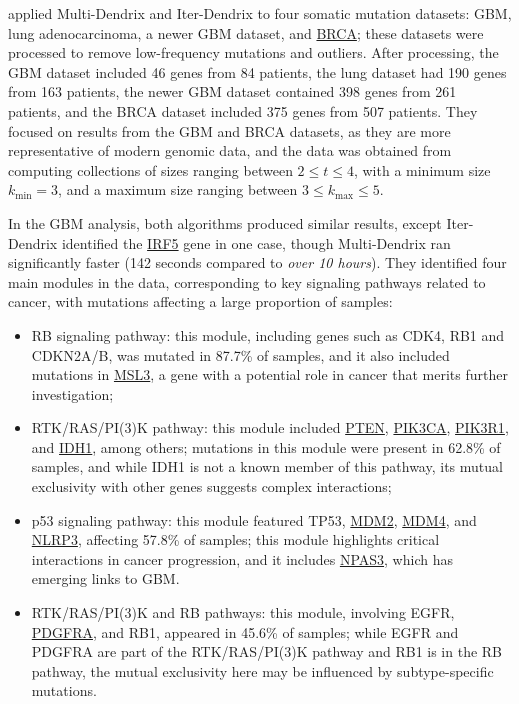 \textcite{multi-dendrix} applied Multi-Dendrix and Iter-Dendrix to four somatic mutation datasets: GBM, lung adenocarcinoma, a newer GBM dataset, and \href{https://en.wikipedia.org/wiki/Breast_cancer}{BRCA}; these datasets were processed to remove low-frequency mutations and outliers. After processing, the GBM dataset included 46 genes from 84 patients, the lung dataset had 190 genes from 163 patients, the newer GBM dataset contained 398 genes from 261 patients, and the BRCA dataset included 375 genes from 507 patients. They focused on results from the GBM and BRCA datasets, as they are more representative of modern genomic data, and the data was obtained from computing collections of sizes ranging between $2 \le t \le 4$, with a minimum size $k_\mathrm {min} = 3$, and a maximum size ranging between $3 \le k_\mathrm{max} \le 5$.

In the GBM analysis, both algorithms produced similar results, except Iter-Dendrix identified the \href{https://en.wikipedia.org/wiki/IRF5}{IRF5} gene in one case, though Multi-Dendrix ran significantly faster (142 seconds compared to \textit{over 10 hours}). They identified four main modules in the data, corresponding to key signaling pathways related to cancer, with mutations affecting a large proportion of samples:

\begin{itemize}
    \item RB signaling pathway: this module, including genes such as CDK4, RB1 and CDKN2A/B, was mutated in 87.7\% of samples, and it also included mutations in \href{https://www.genecards.org/cgi-bin/carddisp.pl?gene=MSL3}{MSL3}, a gene with a potential role in cancer that merits further investigation;
    \item RTK/RAS/PI(3)K pathway: this module included \href{https://en.wikipedia.org/wiki/PTEN_(gene)}{PTEN}, \href{https://en.wikipedia.org/wiki/P110%CE%B1}{PIK3CA}, \href{https://en.wikipedia.org/wiki/PIK3R1}{PIK3R1}, and \href{https://en.wikipedia.org/wiki/IDH1}{IDH1}, among others; mutations in this module were present in 62.8\% of samples, and while IDH1 is not a known member of this pathway, its mutual exclusivity with other genes suggests complex interactions;
    \item p53 signaling pathway: this module featured TP53, \href{https://en.wikipedia.org/wiki/Mdm2}{MDM2}, \href{https://en.wikipedia.org/wiki/MDM4}{MDM4}, and \href{https://en.wikipedia.org/wiki/NLRP3}{NLRP3}, affecting 57.8\% of samples; this module highlights critical interactions in cancer progression, and it includes \href{https://en.wikipedia.org/wiki/NPAS3}{NPAS3}, which has emerging links to GBM.
    \item RTK/RAS/PI(3)K and RB pathways: this module, involving EGFR, \href{https://en.wikipedia.org/wiki/Platelet-derived_growth_factor_receptor_A}{PDGFRA}, and RB1, appeared in 45.6\% of samples; while EGFR and PDGFRA are part of the RTK/RAS/PI(3)K pathway and RB1 is in the RB pathway, the mutual exclusivity here may be influenced by subtype-specific mutations.
\end{itemize}

